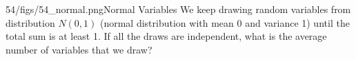 \begin{problem}{54/figs/54_normal.png}{Normal Variables}  We keep drawing random variables from distribution $N(0,1)$ (normal distribution with mean 0 and variance 1) until the total sum is at least 1. If all the draws are independent, what is the average number of variables that we draw?
\end{problem}